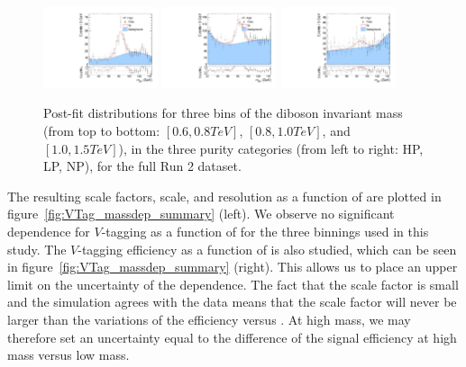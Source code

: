 \begin{figure}[htbp]
  \includegraphics[width=0.3\textwidth]{fig/analysis/PostFit__MJJ__allC_allL_HP_High.pdf}
  \includegraphics[width=0.3\textwidth]{fig/analysis/PostFit__MJJ__allC_allL_LP_High.pdf}
  \includegraphics[width=0.3\textwidth]{fig/analysis/PostFit__MJJ__allC_allL_NP_High.pdf}\\
  \caption{
    Post-fit distributions for three bins of the diboson invariant mass \MVV (from top to bottom: $[0.6,0.8\unit{TeV}]$, $[0.8,1.0\unit{TeV}]$, and $[1.0,1.5\unit{TeV}]$), in the three purity categories (from left to right: HP, LP, NP), for the full Run 2 dataset.
  }
  \label{fig:VTag_postfit_massdep}
\end{figure}

The resulting scale factors, scale, and resolution as a function of \MVV are plotted in figure~\ref{fig:VTag_massdep_summary} (left).
We observe no significant dependence for $V$-tagging as a function of \MVV for the three binnings used in this study.
The $V$-tagging efficiency as a function of \MVV is also studied, which can be seen in figure~\ref{fig:VTag_massdep_summary} (right).
This allows us to place an upper limit on the uncertainty of the \pt dependence.
The fact that the scale factor is small and the simulation agrees with the data means that the scale factor will never be larger than the variations of the efficiency versus \MVV. %
At high mass, we may therefore set an uncertainty equal to the difference of the signal efficiency at high mass versus low mass.

